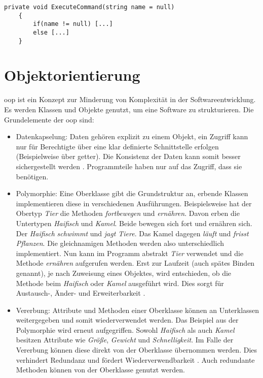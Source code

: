 \begin{lstlisting}[caption=Beispiel zu optionalen Parametern, label=lst:exa_opt]
	private void ExecuteCommand(string name = null)
	{
		if(name != null) [...]
		else [...]
	}
\end{lstlisting}

\section{Objektorientierung}
\label{sec:oop}
\gls{oop} ist ein Konzept zur Minderung von Komplexität in der Softwareentwicklung. Es werden Klassen und Objekte genutzt, um eine Software zu strukturieren. Die Grundelemente der \gls{oop} sind:
\begin{itemize}
	\item Datenkapselung: Daten gehören explizit zu einem Objekt, ein Zugriff kann nur für Berechtigte über eine klar definierte Schnittstelle erfolgen (Beispielweise über \gls{getter}). Die Konsistenz der Daten kann somit besser sichergestellt werden \cite{LahresRayman}. Programmteile haben nur auf das Zugriff, dass sie benötigen. 
	\item \label{label:polymorph} Polymorphie: Eine Oberklasse gibt die Grundstruktur an, erbende Klassen implementieren diese in verschiedenen Ausführungen. Beispielsweise hat der Obertyp \textit{Tier} die Methoden \textit{fortbewegen} und \textit{ernähren}. Davon erben die Untertypen \textit{Haifisch} und \textit{Kamel}. Beide bewegen sich fort und ernähren sich. Der \textit{Haifisch} \textit{schwimmt} und \textit{jagt Tiere}. Das Kamel dagegen \textit{läuft} und \textit{frisst Pflanzen}. Die gleichnamigen Methoden werden also unterschiedlich implementiert. Nun kann im Programm abstrakt \textit{Tier} verwendet und die Methode \textit{ernähren} aufgerufen werden. Erst zur Laufzeit (auch spätes Binden genannt), je nach Zuweisung eines Objektes, wird entschieden, ob die Methode beim \textit{Haifisch} oder \textit{Kamel} ausgeführt wird. Dies sorgt für Austausch-, Änder- und Erweiterbarkeit \cite{LahresRayman}. 
	\item Vererbung: Attribute und Methoden einer Oberklasse können an Unterklassen weitergegeben und somit wiederverwendet werden. Das Beispiel aus der Polymorphie wird erneut aufgegriffen. Sowohl \textit{Haifisch} als auch \textit{Kamel} besitzen Attribute wie \textit{Größe}, \textit{Gewicht} und \textit{Schnelligkeit}. Im Falle der Vererbung können diese direkt von der Oberklasse übernommen werden. Dies verhindert Redundanz und fördert Wiederverwendbarkeit \cite{LahresRayman}. Auch redundante Methoden können von der Oberklasse genutzt werden. 
\end{itemize}

